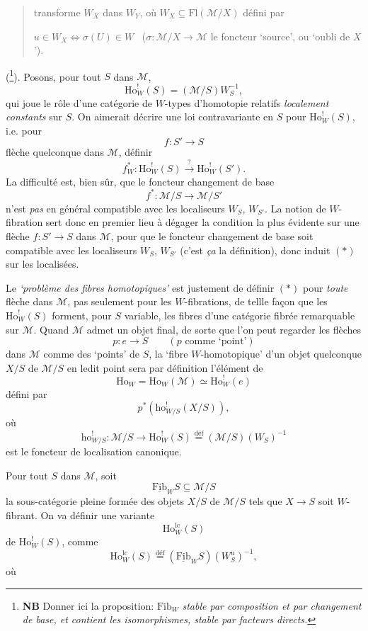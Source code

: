 \documentclass[11pt]{article}
\newcommand{\printedpage}[1]{\marginpar{\footnotesize p.~#1}}
\newcommand{\msp}[1]{\marginpar{\footnotesize [#1]}}
\newcommand{\cM}{\mathcal{M}}
\newcommand{\Ho}{\mathrm{Ho}}
\newcommand{\ho}{\mathrm{ho}}
\newcommand{\Fl}{\mathrm{Fl}}
\newcommand{\Fib}{\underline{\mathrm{Fib}}}
\newcommand{\Wu}{W^{\mathrm{u}}}
\newcommand{\lc}{\mathrm{lc}}
\begin{document}
\printedpage{135}

\begin{quote}
transforme $W_X$ dans $W_Y$, où $W_X \subseteq \Fl(\cM/X)$ défini par

$u \in W_X \iff \sigma(U) \in W$ \ ($\sigma : \cM/X \longrightarrow \cM$ le foncteur ‘source’, ou ‘oubli de $X$’). %
\end{quote}

(\footnote[120]{\textbf{NB} Donner ici la proposition: $\mathrm{Fib}_W$ \textit{stable par composition et par changement de base, et contient les isomorphismes, stable par facteurs directs.}}). Posons, pour tout $S$ dans $\cM$,
\[
\Ho^!_W(S) = (\cM/S)W_S^{-1},
\]
qui joue le rôle d'une catégorie de $W$-types d'homotopie relatifs \textit{localement constants} sur $S$. On aimerait décrire une loi contravariante en $S$ pour $\Ho^!_W(S)$, i.e. pour
\[
f : S' \longrightarrow S
\]
flèche quelconque dans $\cM$, définir
\[
f^*_W : \Ho^!_W(S) \xrightarrow{?} \Ho^!_W(S'). \tag*{$(*)$}
\]
La difficulté est, bien sûr, que le foncteur changement de base
\[
f^* : \cM/S \longrightarrow \cM/S'
\]
n'est \textit{pas} en général compatible avec les \msp{page 209} localiseurs $W_S$, $W_{S'}$. La notion de $W$-fibration sert donc en premier lieu à dégager la condition la plus évidente sur une flèche $f : S' \longrightarrow S$ dans $\cM$, pour que le foncteur changement de base soit compatible avec les localiseurs $W_S$, $W_{S'}$ (c'est \textit{ça} la définition), donc induit $(*)$ sur les localisées.

Le \textit{‘problème des fibres homotopiques’} est justement de définir $(*)$ pour \textit{toute} flèche dans $\cM$, pas seulement pour les $W$-fibrations, de tellle façon que les $\Ho^!_W(S)$ forment, pour $S$ %
variable, les fibres d'une catégorie fibrée remarquable sur $\cM$. Quand $\cM$ admet un objet final, de sorte que l'on peut regarder les flèches
\[
p : e \longrightarrow S \qquad (p \text{ comme ‘point’})
\]
dans $\cM$ comme des ‘points’ de $S$, la ‘fibre $W$-homotopique’ d'un objet quelconque $X/S$ de $\cM/S$ en ledit point sera par définition l'élément de
\[
\Ho_W = \Ho_W(\cM) \simeq \Ho^!_W(e)
\]
défini par
\[
p^*(\ho^!_{W/S}(X/S)),
\]
\printedpage{136}
\msp{page 210}
où
\[
\ho^!_{W/S} : \cM/S \longrightarrow \Ho^!_W(S) \overset{\text{déf}}{=} (\cM/S)(W_S)^{-1}
\]
est le foncteur de localisation canonique.

Pour tout $S$ dans $\cM$, soit
\[
\Fib_W S \subseteq \cM/S
\]
la sous-catégorie pleine formée des objets $X/S$ de $\cM/S$ tels que $X \longrightarrow S$ soit $W$-fibrant. On va définir une variante
\[
\Ho^{\lc}_W(S)
\]
de $\Ho^!_W(S)$, comme
\[
\Ho^{\lc}_W(S) \overset{\text{déf}}{=} (\Fib_W S)(\Wu_S)^{-1},
\]
où
\end{document}
